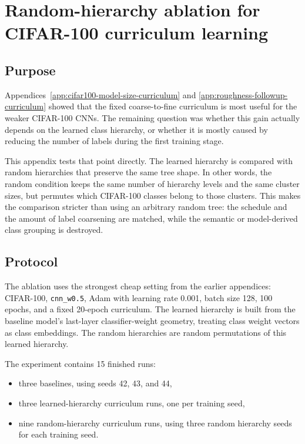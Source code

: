 \chapter{Random-hierarchy ablation for CIFAR-100 curriculum learning}
\label{app:hierarchy-ablation-curriculum}

\section{Purpose}

Appendices~\ref{app:cifar100-model-size-curriculum} and
\ref{app:roughness-followup-curriculum} showed that the fixed coarse-to-fine
curriculum is most useful for the weaker CIFAR-100 CNNs. The remaining question
was whether this gain actually depends on the learned class hierarchy, or
whether it is mostly caused by reducing the number of labels during the first
training stage.

This appendix tests that point directly. The learned hierarchy is compared with
random hierarchies that preserve the same tree shape. In other words, the random
condition keeps the same number of hierarchy levels and the same cluster sizes,
but permutes which CIFAR-100 classes belong to those clusters. This makes the
comparison stricter than using an arbitrary random tree: the schedule and the
amount of label coarsening are matched, while the semantic or model-derived
class grouping is destroyed.

\section{Protocol}

The ablation uses the strongest cheap setting from the earlier appendices:
CIFAR-100, \texttt{cnn\_w0.5}, Adam with learning rate 0.001, batch size 128,
100 epochs, and a fixed 20-epoch curriculum. The learned hierarchy is built from
the baseline model's last-layer classifier-weight geometry, treating class
weight vectors as class embeddings. The random hierarchies are random
permutations of this learned hierarchy.

The experiment contains 15 finished runs:

\begin{itemize}
    \item three baselines, using seeds 42, 43, and 44,
    \item three learned-hierarchy curriculum runs, one per training seed,
    \item nine random-hierarchy curriculum runs, using three random hierarchy
          seeds for each training seed.
\end{itemize}

